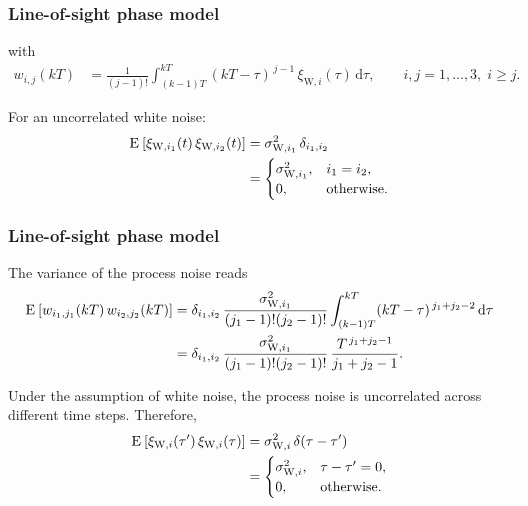 \documentclass[
    hyperref={colorlinks,citecolor=DeepPink4,linkcolor=DarkRed,urlcolor=DarkBlue}
]{beamer_class}
\begin{document}
\begin{frame}[t]
    \frametitle{Line-of-sight phase model}

    with
    \begin{align}
        w_{i,j}(kT) &= \frac{1}{(j-1)!} \int_{(k-1)T}^{kT} (kT-\tau)^{\,j-1}\,\xi_{\mathrm{W},i}(\tau)\,\mathrm{d}\tau, \qquad i,j = 1,\dots,3,\; i \ge j.
    \end{align}

    For an uncorrelated white noise:
    \begin{align}
        \E{\xi_{\mathrm{W},i_{1}}(t)\,\xi_{\mathrm{W},i_{2}}(t)}
        &= \sigma_{\mathrm{W},i_{1}}^{2}\,\delta_{i_{1},i_{2}} \\
        &= \begin{cases}
            \sigma_{\mathrm{W},i_{1}}^{2}, & i_{1}=i_{2}, \\
            0, & \text{otherwise.}
        \end{cases}
    \end{align}

\end{frame}

\begin{frame}
    \frametitle{Line-of-sight phase model}

    The variance of the process noise reads
    \begin{align}
        \E{ w_{i_{1},j_{1}}(kT)\,w_{i_{2},j_{2}}(kT)}
        &= \delta_{i_{1},i_{2}}\,\frac{\sigma_{\mathrm{W},i_{1}}^{2}}{(j_{1}-1)!(j_{2}-1)!}\int_{(k-1)T}^{kT} (kT-\tau)^{\,j_{1}+j_{2}-2}\,\mathrm{d}\tau \nonumber \\
        &= \delta_{i_{1},i_{2}}\,\frac{\sigma_{\mathrm{W},i_{1}}^{2}}{(j_{1}-1)!(j_{2}-1)!}\,\frac{T^{\,j_{1}+j_{2}-1}}{j_{1}+j_{2}-1}.
    \end{align}

    Under the assumption of white noise, the process noise is uncorrelated across different time steps. Therefore,
    \begin{align}
        \E{\xi_{\mathrm{W},i}(\tau')\,\xi_{\mathrm{W},i}(\tau)}
        &= \sigma_{\mathrm{W},i}^{2}\,\delta(\tau-\tau') \\
        &= \begin{cases}
            \sigma_{\mathrm{W},i}^{2}, & \tau-\tau' = 0, \\
            0, & \text{otherwise.}
        \end{cases}
    \end{align}

\end{frame}
\end{document}
